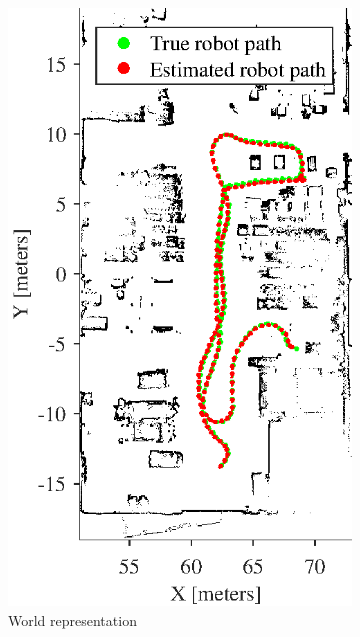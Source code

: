 \begin{figure}[htbp]
	\centering
	\begin{subfigure}[t]{0.4\textwidth}
		\includegraphics[width=\textwidth]{figures/static_mapping/simulation_poses_stage_map}
		\caption{World representation}
		\label{fig:simulated_small_world}
	\end{subfigure}
	\begin{subfigure}[t]{0.4\textwidth}

\end{subfigure}
\end{figure}
